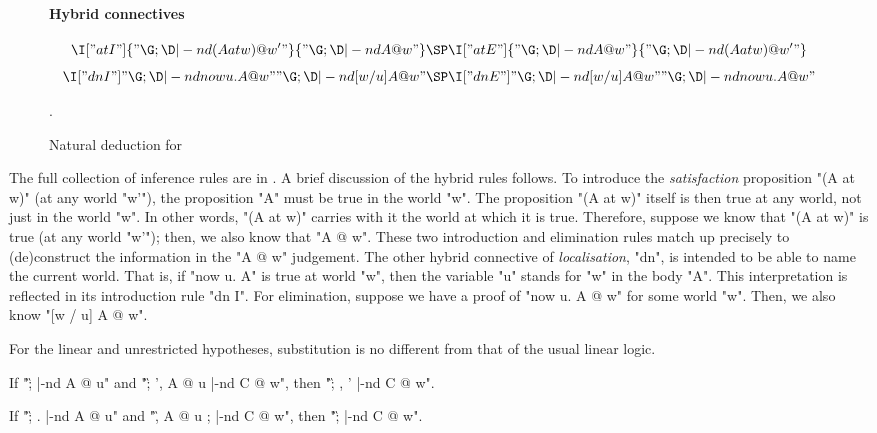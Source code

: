 \documentclass{article}
\begin{document}
\begin{figure*}[tp]
{\begin{minipage}{0.9\textwidth}
\paragraph{Hybrid connectives}
\begin{gather*}
  \I["at I"]{"\G ; \D |-nd (A at w) @ {w'}"}
    {"\G ; \D |-nd A @ w"}
  \SP
  \I["at E"]{"\G ; \D |-nd A @ w"}
    {"\G ; \D |-nd (A at w) @ {w'}"}
  \\[1ex]
  \I["{dn} I"]{"\G ; \D |-nd now u. A @ w"}
    {"\G ; \D |-nd [w / u] A @ w"}
  \SP
  \I["{dn} E"]{"\G ; \D |-nd [w / u] A @ w"}
    {"\G ; \D |-nd now u. A @ w"}
\end{gather*}
\end{minipage}}
\caption{Natural deduction for \hyll}.
\label{fig:nd-rules}
\end{figure*}

The full collection of inference rules are in . A brief
discussion of the hybrid rules follows. To introduce the \emph{satisfaction}
proposition "(A at w)" (at any world "w'"), the proposition "A" must be true in the
world "w". The proposition "(A at w)" itself is then true at any world, not just
in the world "w". In other words, "(A at w)" carries with it the world at which
it is true. Therefore, suppose we know that "(A at w)" is true (at any world "w'");
then, we also know that "A @ w". These two introduction and
elimination rules match up precisely to (de)construct the information in the "A
@ w" judgement.
The other hybrid connective of \emph{localisation}, "dn", is intended to be
able to name the current world. That is, if "now u. A" is true at world "w",
then the variable "u" stands for "w" in the body "A". This interpretation is
reflected in its introduction rule "{dn} I". For elimination, suppose we have a
proof of "now u. A @ w" for some world "w". Then, we also know "[w / u] A @ w".

For the linear and unrestricted hypotheses, substitution is no different 
from that of the usual linear logic.

\begin{thm}[substitution] \label{thm:subst} \mbox{}
\begin{ecom}
  \item \label{thm:subst.1}
    If "\G ; \D |-nd A @ u" and "\G ; \D', A @ u |-nd C @ w", then "\G ; \D, \D' |-nd C @ w".
  \item  \label{thm:subst.2}
    If "\G ; . |-nd A @ u" and "\G, A @ u ; \D |-nd C @ w", then "\G ; \D |-nd C @ w".
  \end{ecom}
\end{thm}
\end{document}
